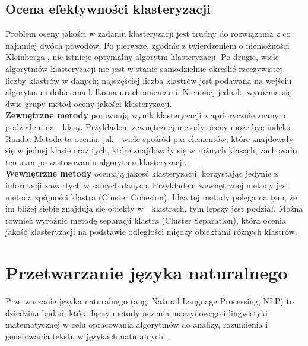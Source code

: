 	\subsection{Ocena efektywności klasteryzacji}
		Problem oceny jakości w zadaniu klasteryzacji jest trudny do rozwiązania z co najmniej dwóch powodów. Po pierwsze, zgodnie z twierdzeniem o niemożności Kleinberga \cite{Kleinberg}, nie istnieje optymalny algorytm klasteryzacji. Po drugie, wiele algorytmów klasteryzacji nie jest w stanie samodzielnie określić rzeczywistej liczby klastrów w danych; najczęściej liczba klastrów jest podawana na wejściu algorytmu i dobierana kilkoma uruchomieniami.
		Niemniej jednak, wyróżnia się dwie grupy metod oceny jakości klasteryzacji.\\

		\textbf{Zewnętrzne metody} porównują wynik klasteryzacji z apriorycznie znanym podziałem na~~klasy. Przykładem zewnętrznej metody oceny może być indeks Randa. Metoda ta ocenia, jak~~wiele spośród par elementów, które znajdowały się w jednej klasie oraz tych, które znajdowały się w różnych klasach, zachowało ten stan po zastosowaniu algorytmu klasteryzacji.\\
	   
	    \textbf{Wewnętrzne metody} oceniają jakość klasteryzacji, korzystając jedynie z informacji zawartych w samych danych. Przykładem wewnętrznej metody jest metoda spójności klastra (Cluster Cohesion). Idea tej metody polega na tym, że im bliżej siebie znajdują się obiekty w~~klastrach, tym lepszy jest podział. Można również wyróżnić metodę separacji klastra (Cluster Separation), która ocenia jakość klasteryzacji na podstawie odległości między obiektami różnych klastrów.



\section{Przetwarzanie języka naturalnego}

	Przetwarzanie języka naturalnego (ang. Natural Language Processing, NLP) to dziedzina badań, która łączy metody uczenia maszynowego i lingwistyki matematycznej w celu opracowania algorytmów do analizy, rozumienia i generowania tekstu w językach naturalnych \cite{NLP}.
		
		
